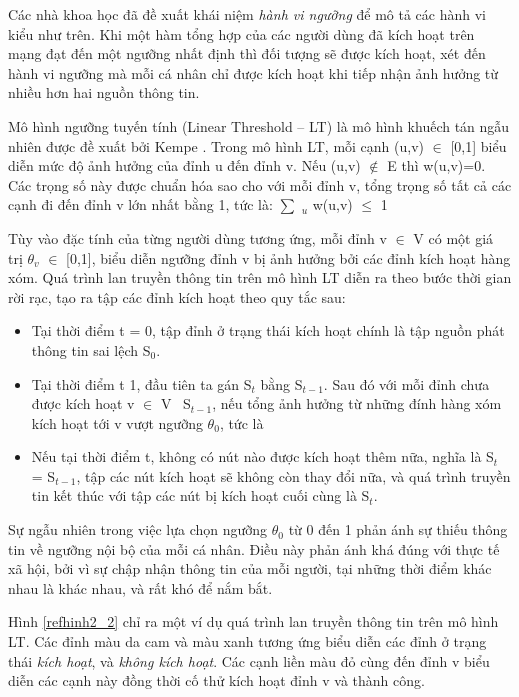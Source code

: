 	Các nhà khoa học đã đề xuất khái niệm {\itshape hành vi ngưỡng} để mô tả các hành vi kiểu như trên. Khi một hàm tổng hợp của các người dùng đã kích hoạt trên mạng đạt đến một ngưỡng nhất định thì  đối tượng sẽ được kích hoạt, xét đến hành vi ngưỡng mà mỗi cá nhân chỉ được kích hoạt khi tiếp nhận ảnh hưởng từ nhiều hơn hai nguồn thông tin.
	
	Mô hình ngưỡng tuyến tính (Linear Threshold – LT) là mô hình khuếch tán ngẫu nhiên được đề xuất bởi Kempe \cite{kemple1}. Trong mô hình LT, mỗi cạnh (u,v) $\in$ [0,1] biểu diễn mức độ ảnh hưởng của đỉnh u đến đỉnh v. Nếu (u,v) $\notin$ E thì w(u,v)=0. Các trọng số này được chuẩn hóa sao cho với mỗi đỉnh v, tổng trọng số tất cả các cạnh đi đến đỉnh v lớn nhất bằng 1, tức là: $\sum$ $_{u}$ w(u,v) $\leq$ 1 %
	
	Tùy vào đặc tính của từng người dùng tương ứng, mỗi đỉnh v $\in$ V có một giá trị $\theta$$_{v}$ $\in$ [0,1], biểu diễn ngưỡng đỉnh v bị ảnh hưởng bởi các đỉnh kích hoạt hàng xóm. Quá trình lan truyền thông tin trên mô hình LT diễn ra theo bước thời gian rời rạc, tạo ra tập các đỉnh kích hoạt theo quy tắc sau:
	\begin {itemize}
		\item Tại thời điểm t = 0, tập đỉnh ở trạng thái kích hoạt chính là tập nguồn phát thông tin sai lệch S$_{0}$.
	
		\item Tại thời điểm t  1, đầu tiên ta gán S$_{t}$ bằng S$_{t-1}$. Sau đó với mỗi đỉnh chưa được kích hoạt v $\in$ V \ S$_{t-1}$, nếu tổng ảnh hưởng từ những đính hàng xóm kích hoạt tới v vượt ngưỡng $\theta$$_{0}$, tức là %
	
		\item Nếu tại thời điểm t, không có nút nào được kích hoạt thêm nữa, nghĩa là S$_{t}$ = S$_{t-1}$, tập các nút kích hoạt sẽ không còn thay đổi nữa, và quá trình truyền tin kết thúc với tập các nút bị kích hoạt cuối cùng là S$_{t}$.
	\end {itemize}
	Sự ngẫu nhiên trong việc lựa chọn ngưỡng $\theta$$_{0}$ từ 0 đến 1 phản ánh sự thiếu thông tin về ngưỡng nội bộ của mỗi cá nhân. Điều này phản ánh khá đúng với thực tế xã hội, bởi vì sự chập nhận thông tin của mỗi người, tại những thời điểm khác nhau là khác nhau, và rất khó để nắm bắt. 
	
	Hình \ref{refhinh2_2} chỉ ra một ví dụ quá trình lan truyền thông tin trên mô hình LT. Các đỉnh màu da cam và màu xanh tương ứng biểu diễn các đỉnh ở trạng thái {\itshape kích hoạt}, và {\itshape không kích hoạt}. Các cạnh liền màu đỏ cùng đến đỉnh v biểu diễn các cạnh này đồng thời cố thử kích hoạt đỉnh v và thành công.
	
